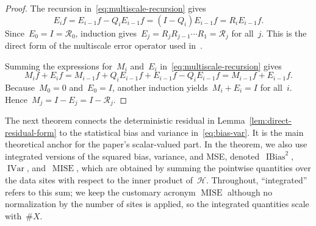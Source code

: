 \documentclass[12pt]{article}
\DeclareMathOperator{\mise}{MISE}
\newcommand{\ibias}{\operatorname{IBias}^2}
\DeclareMathOperator{\ivar}{IVar}
\begin{document}
\begin{proof}
The recursion in~\eqref{eq:multiscale-recursion} gives
\[
    E_i f = E_{i-1}f-Q_iE_{i-1}f=(I-Q_i)E_{i-1}f = R_iE_{i-1}f.
\]
Since~$E_0=I=\mathcal R_0$, induction gives~$E_j=R_jR_{j-1}\cdots R_1=\mathcal R_j$ for all~$j$. This is the direct form of the multiscale error operator used in~\cite{franz2023multilevel}.

Summing the expressions for~$M_i$ and~$E_i$ in~\eqref{eq:multiscale-recursion} gives
\[
    M_i f+E_i f
    =M_{i-1}f+Q_iE_{i-1}f+E_{i-1}f-Q_iE_{i-1}f
    =M_{i-1}f+E_{i-1}f.
\]
Because~$M_0=0$ and~$E_0=I$, another induction yields~$M_i+E_i=I$ for all~$i$. Hence~$M_j=I-E_j=I-\mathcal R_j$.
\end{proof}

The next theorem connects the deterministic residual in Lemma~\ref{lem:direct-residual-form} to the statistical bias and variance in~\eqref{eq:bias-var}. It is the main theoretical anchor for the paper's scalar-valued part. In the theorem, we also use integrated versions of the squared bias, variance, and MSE, denoted~$\ibias$,~$\ivar$, and~$\mise$, which are obtained by summing the pointwise quantities over the data sites with respect to the inner product of~$\mathcal H$. Throughout, ``integrated'' refers to this sum; we keep the customary acronym $\mise$ although no normalization by the number of sites is applied, so the integrated quantities scale with~$\#X$.
\end{document}
